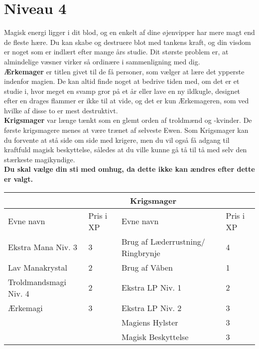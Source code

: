 \chapter*{Niveau 4}
Magisk energi ligger i dit blod, og en enkelt af dine øjenvipper har mere magt end de fleste hære. Du kan skabe og destruere blot med tankens kraft, og din visdom er noget som er indlært efter mange års studie. Dit største problem er, at almindelige væsner virker så ordinære i sammenligning med dig.\\

\textbf{Ærkemager} er titlen givet til de få personer, som vælger at lære det ypperste indenfor magien. De kan altid finde noget at bedrive tiden med, om det er et studie i, hvor meget en svamp gror på et år eller lave en ny ildkugle, designet efter en drages flammer er ikke til at vide, og det er kun Ærkemageren, som ved hvilke af disse to er mest destruktivt.\\
\textbf{Krigsmager} var længe tænkt som en glemt orden af troldmænd og -kvinder. De første krigsmagere menes at være trænet af selveste Ewen. Som Krigsmager kan du forvente at stå side om side med krigere, men du vil også få adgang til kraftfuld magisk beskyttelse, således at du ville kunne gå tå til tå med selv den stærkeste magikyndige.\\

\textbf{Du skal vælge din sti med omhug, da dette ikke kan ændres efter dette er valgt.}\\


\begin{tabular}{|p{}|p{}|p{}|p{}|}
\hline
\rowcolor{cerulean!80}
 \multicolumn{2}{|c|}{ Ærkemager } & \multicolumn{2}{|c|}{ Krigsmager }\\
\hline
\rowcolor{cerulean!40}
    Evne navn & Pris i XP & Evne navn & Pris i XP\\ \hline
    Ekstra Mana Niv. 3 & 3& Brug af Læderrustning/ Ringbrynje & 4\\\hline
    Lav Manakrystal & 2& Brug af Våben & 1 \\\hline
    Troldmandsmagi Niv. 4 & 2 & Ekstra LP Niv. 1 & 2\\\hline
    Ærkemagi & 3& Ekstra LP Niv. 2 & 3\\\hline
    && Magiens Hylster& 3\\\hline
    && Magisk Beskyttelse & 3\\\hline
\end{tabular}

